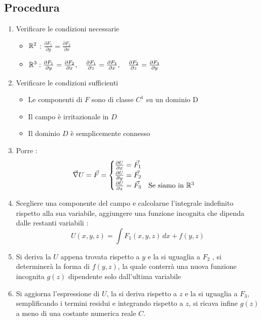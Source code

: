 \subsection{Procedura}
\begin{enumerate}
    \item Verificare le condizioni necessarie
    \begin{itemize} 
        \item{\LARGE $\mathbb{R}^{2}$ : $\frac{\partial F_{1}}{\partial y} = \frac{\partial F_{2}}{\partial x}$}
        \item {\LARGE $\mathbb{R}^{3}: \frac{\partial F_1}{\partial y} = \frac{\partial F_2}{\partial x}, \quad 
        \frac{\partial F_1}{\partial z} = \frac{\partial F_3}{\partial x}, \quad 
        \frac{\partial F_2}{\partial z} = \frac{\partial F_3}{\partial y}$} 
    \end{itemize}
    \item Verificare le condizioni sufficienti
    \begin{itemize}
        \item Le componenti di $F$ sono di classe $C^{1}$ su un dominio D
        \item Il campo è irritazionale in $D$
        \item Il dominio $D$ è semplicemente connesso
    \end{itemize}
    \item Porre :
    {\large
    $$
    \vec{\nabla}U=\vec{F}= 
    \begin{cases}
    \frac{\partial U}{\partial x} = \vec{F_{1}} \\
    \frac{\partial U}{\partial y} = \vec{F_{2}} \\
    \frac{\partial U}{\partial z} = \vec{F_{3}} \quad \text{Se siamo in $\mathbb{R}^3$}  \\
    \end{cases}
    $$
    }
    \item Scegliere una componente del campo e calcolarne l'integrale indefinito rispetto alla sua variabile, aggiungere una funzione incognita che dipenda dalle restanti variabili  :  $$U(x, y, z) = \int F_1(x, y, z) \, dx + f(y, z)$$
    \item Si deriva la $U$ appena trovata  rispetto a $y$ e la si uguaglia a $F_{2}$ , si determinerà la forma di $f(y,z)$, la quale conterrà una nuova funzione incognita $g(z)$ dipendente solo dall'ultima variabile
    \item  Si aggiorna l'espressione di $U$, la si deriva rispetto a $z$ e la si uguaglia a $F_3$, semplificando i termini residui e integrando rispetto a $z$, si ricava infine $g(z)$ a meno di una costante numerica reale $C$.
\end{enumerate}

